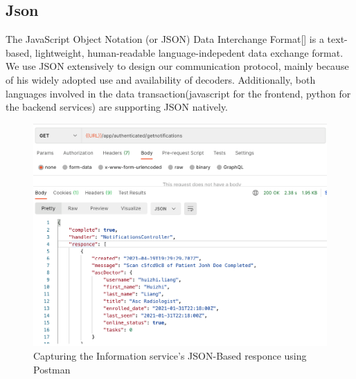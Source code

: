 		\subsection{Json}
			The JavaScript Object Notation (or JSON) Data Interchange Format[\cite{json-rfc7159}] is a text-based, lightweight, human-readable language-indepedent
			data exchange format. We use JSON extensively to design our communication protocol, mainly because of his widely adopted use and availability of
			decoders. Additionally, both languages involved in the data transaction(javascript for the frontend, python for the backend services) are supporting
			JSON natively.
			\begin{figure}[H]
				\iftrue
				\caption{Capturing the Information service's JSON-Based responce using Postman}
				\centering
				\includegraphics[scale=0.3]{figures/json}
				\fi
			\end{figure} 
